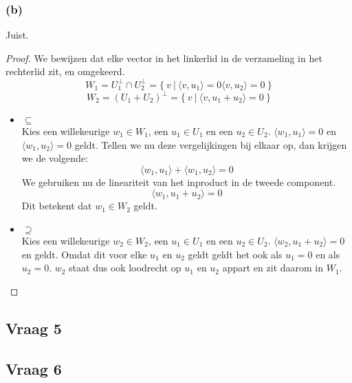 \documentclass[lineaire_algebra_oplossingen.tex]{subfiles}
\begin{document}
\subsubsection*{(b)}
Juist.
\begin{proof}
We bewijzen dat elke vector in het linkerlid in de verzameling in het rechterlid zit, en omgekeerd.
\[
W_1 = U_1^\bot \cap U_2^\bot = \{\ v\ |\ \langle v,u_1\rangle = 0 \langle v,u_2\rangle = 0\ \}
\]
\[
W_2 = (U_1+U_2)^\bot = \{\ v\ |\ \langle v, u_1+u_2\rangle = 0\ \}
\]
\begin{itemize}
\item $\subseteq$\\
Kies een willekeurige $w_1 \in W_1$, een $u_1 \in U_1$ en een $u_2 \in U_2$. $\langle w_1,u_1\rangle = 0$ en $\langle w_1,u_2\rangle = 0$ geldt. Tellen we nu deze vergelijkingen bij elkaar op, dan krijgen we de volgende:
\[
\langle w_1,u_1\rangle + \langle w_1,u_2\rangle = 0
\]
We gebruiken nu de lineariteit van het inproduct in de tweede component.
\[
\langle w_1,u_1+u_2\rangle = 0
\]
Dit betekent dat $w_1 \in W_2$ geldt.

\item $\supseteq$\\
Kies een willekeurige $w_2 \in W_2$, een $u_1 \in U_1$ en een $u_2 \in U_2$. $\langle w_2,u_1+u_2\rangle = 0$ en geldt.
Omdat dit voor elke $u_1$ en $u_2$ geldt geldt het ook als $u_1=0$ en als $u_2=0$. $w_2$ staat dus ook loodrecht op $u_1$ en $u_2$ appart en zit daarom in $W_1$.
\end{itemize}
\end{proof}

\subsection{Vraag 5}

\subsection{Vraag 6}
\end{document}
